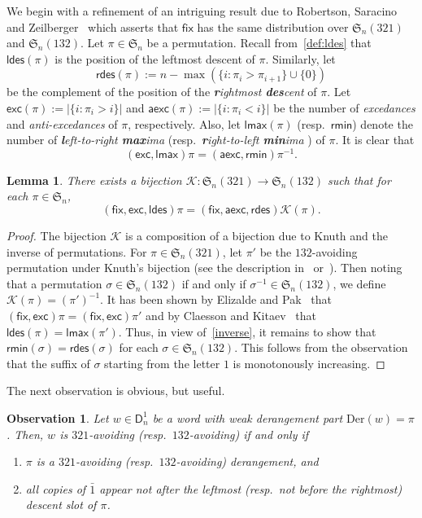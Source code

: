 \documentclass[12pt]{amsart} %
\numberwithin{equation}{section}
\theoremstyle{plain}
\newtheorem{lemma}[theorem]{Lemma}
\newtheorem{Observation}[theorem]{Observation}
\theoremstyle{definition}
\newcommand\D{\mathsf{D}}
\def\rmin{\mathsf{rmin}}
\def\lmax{\mathsf{lmax}}
\def\rdes{\mathsf{rdes}}
\def\Der{\mathrm{Der}}
\def\fix{\mathsf{fix}}
\def\max{\mathrm{max}}
\def\exc{\mathsf{exc}}
\def\aexc{\mathsf{aexc}}
\def\S{\mathfrak{S}}
\def\ldes{\mathsf{ldes}}
\def\max{\operatorname{max}}
\def\neg#1{{{{\bar#1}}}}
\begin{document}
We begin with  a refinement of  an intriguing  result due to Robertson,  Saracino and  Zeilberger~\cite{rsz} which asserts that $\fix$ has the same distribution over $\S_n(321)$ and $\S_n(132)$. Let $\pi\in\S_n$ be a permutation. Recall from~\eqref{def:ldes} that $\ldes(\pi)$ is the position of the  leftmost descent of $\pi$. Similarly, let 
$$
\rdes(\pi):=n-\max(\{i:\pi_i>\pi_{i+1}\}\cup\{0\})
$$
be the complement of the position of the {\em{\bf\em r}ightmost {\bf\em des}cent} of $\pi$. Let $\exc(\pi):=|\{i:\pi_i>i\}|$ and $\aexc(\pi):=|\{i:\pi_i<i\}|$ be the number of {\em excedances} and {\em anti-excedances} of $\pi$, respectively. Also, let  $\lmax(\pi)$ (resp.~$\rmin$) denote the number of {\em {\bf\em l}eft-to-right {\bf\em max}ima} (resp.~{\em {\bf\em r}ight-to-left {\bf\em min}ima} ) of $\pi$. It is clear that 
\begin{equation}\label{inverse}
(\exc,\lmax)\pi=(\aexc,\rmin)\pi^{-1}.
\end{equation}
\begin{lemma}\label{lem:knuth}
There exists a bijection $\mathcal{K}: \S_n(321)\rightarrow\S_n(132)$ such that for each $\pi\in\S_n$,
$$
(\fix,\exc,\ldes)\pi=(\fix,\aexc,\rdes)\mathcal{K}(\pi).
$$
\end{lemma}
\begin{proof}
The bijection $\mathcal{K}$ is a composition of a bijection due to Knuth and the inverse of permutations. For $\pi\in\S_n(321)$, let $\pi'$ be the $132$-avoiding permutation under Knuth's bijection (see the description in~\cite[Sec.~3.1]{ck} or~\cite{ep}). Then noting that a permutation $\sigma\in\S_n(132)$ if and only if $\sigma^{-1}\in\S_n(132)$, we define $\mathcal{K}(\pi)=(\pi')^{-1}$. It has been shown by Elizalde and Pak~\cite{ep} that $(\fix,\exc)\pi=(\fix,\exc)\pi'$ and by Claesson and  Kitaev~\cite[Sec.~6.4]{ck} that $\ldes(\pi)=\lmax(\pi')$. Thus, in view of~\eqref{inverse}, it remains to show that $\rmin(\sigma)=\rdes(\sigma)$ for each $\sigma\in\S_n(132)$. This follows from the observation that the suffix of $\sigma$ starting from the letter $1$ is monotonously increasing. 
\end{proof}

The next observation is obvious, but useful. 

\begin{Observation}\label{obser:der1}
Let $w\in\D_n^1$ be a word with weak derangement part $\Der(w)=\pi$. Then, $w$ is $321$-avoiding (resp.~$132$-avoiding) if and only if 
\begin{enumerate}
	\item $\pi$ is a $321$-avoiding (resp.~$132$-avoiding) derangement, and
	\item all copies of $\neg1$ appear not after  the leftmost  (resp.~not before the rightmost) descent slot of $\pi$.
\end{enumerate} 
\end{Observation}
\end{document}
